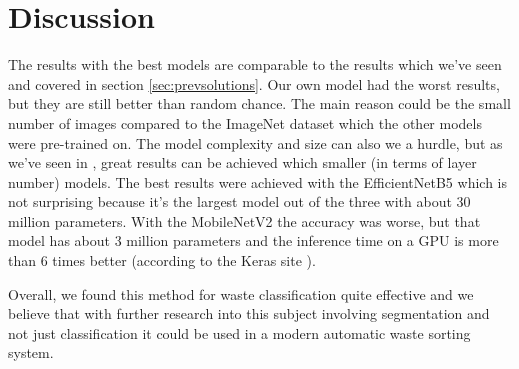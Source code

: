 \documentclass[twocolumn]{article}
\begin{document}
	\section{Discussion}
	The results with the best models are comparable to the results which we've seen and covered in section \ref{sec:prevsolutions}.
	Our own model had the worst results, but they are still better than random chance. The main reason could be the small number of images compared to the ImageNet dataset which the other models were pre-trained on. The model complexity and size can also we a hurdle, but as we've seen in \cite{Chu2018}, great results can be achieved which smaller (in terms of layer number) models.
	The best results were achieved with the EfficientNetB5 which is not surprising because it's the largest model out of the three with about 30 million parameters. With the MobileNetV2 the accuracy was worse, but that model has about 3 million parameters and the inference time on a GPU is more than 6 times better (according to the Keras site \cite{keras_applications}).
	
	Overall, we found this method for waste classification quite effective and we believe that with further research into this subject involving segmentation and not just classification it could be used in a modern automatic waste sorting system.
	
	
	
	
\end{document}
